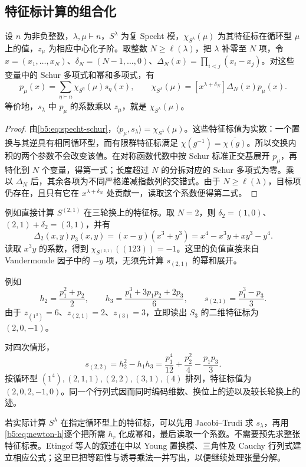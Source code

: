 \subsection{特征标计算的组合化}
\label{b5:subsec:0702:03}

\begin{corollary}\label{b5:cor:frobenius-coefficient}
	设 \(n\) 为非负整数，\(\lambda,\mu\vdash n\)，\(S^\lambda\) 为复 Specht 模，\(\chi_{S^\lambda}(\mu)\) 为其特征标在循环型 \(\mu\) 上的值，\(z_\mu\) 为相应中心化子阶。取整数 \(N\ge\ell(\lambda)\)，把 \(\lambda\) 补零至 \(N\) 项，令 \(x=(x_1,\ldots,x_N)\)、\(\delta_N=(N-1,\ldots,0)\)、\(\Delta_N(x)=\prod_{i<j}(x_i-x_j)\)。对这些变量中的 Schur 多项式和幂和多项式，有
	\[
		p_\mu(x)=\sum_{\eta\vdash n}\chi_{S^\eta}(\mu)s_\eta(x), \qquad \chi_{S^\lambda}(\mu) =[x^{\lambda+\delta_N}]\Delta_N(x)p_\mu(x).
	\]
	等价地，\(s_\lambda\) 中 \(p_\mu\) 的系数乘以 \(z_\mu\)，就是 \(\chi_{S^\lambda}(\mu)\)。
\end{corollary}
\begin{proof}
	由\eqref{b5:eq:specht-schur}，\(\langle p_\mu,s_\lambda\rangle=\chi_{S^\lambda}(\mu)\)。这些特征标值为实数：一个置换与其逆具有相同循环型，而有限群特征标满足 \(\chi(g^{-1})=\overline{\chi(g)}\)。所以交换内积的两个参数不会改变该值。在对称函数代数中按 Schur 标准正交基展开 \(p_\mu\)，再特化到 \(N\) 个变量，得第一式；长度超过 \(N\) 的分拆对应的 Schur 多项式为零。乘以 \(\Delta_N\) 后，其余各项为不同严格递减指数列的交错式。由于 \(N\ge\ell(\lambda)\)，目标项仍存在，且只有它在 \(x^{\lambda+\delta_N}\) 处贡献一，读取这个系数便得第二式。
\end{proof}

例如直接计算 \(S^{(2,1)}\) 在三轮换上的特征标。取 \(N=2\)，则 \(\delta_2=(1,0)\)、\((2,1)+\delta_2=(3,1)\)，并有
\[
	\Delta_2(x,y)p_3(x,y) =(x-y)(x^3+y^3)=x^4-x^3y+xy^3-y^4.
\]
读取 \(x^3y\) 的系数，得到 \(\chi_{S^{(2,1)}}((123))=-1\)。这里的负值直接来自 Vandermonde 因子中的 \(-y\) 项，无须先计算 \(s_{(2,1)}\) 的幂和展开。

\ProseParagraphBreak

例如
\[
	h_2=\frac{p_1^2+p_2}{2},\qquad h_3=\frac{p_1^3+3p_1p_2+2p_3}{6}, \qquad s_{(2,1)}=\frac{p_1^3-p_3}{3}.
\]
由于 \(z_{(1^3)}=6\)、\(z_{(2,1)}=2\)、\(z_{(3)}=3\)，立即读出 \(S_3\) 的二维特征标为 \((2,0,-1)\)。

\ProseParagraphBreak
对四次情形，
\[
	s_{(2,2)}=h_2^2-h_1h_3 =\frac{p_1^4}{12}+\frac{p_2^2}{4}-\frac{p_1p_3}{3}.
\]
按循环型 \((1^4),(2,1,1),(2,2),(3,1),(4)\) 排列，特征标值为 \((2,0,2,-1,0)\)。同一个行列式因而同时编码维数、换位上的迹以及较长轮换上的迹。

\ProseParagraphBreak
若实际计算 \(S^\lambda\) 在指定循环型上的特征标，可以先用 Jacobi--Trudi 求 \(s_\lambda\)，再用\eqref{b5:eq:newton-h}逐个把所需 \(h_r\) 化成幂和，最后读取一个系数。不需要预先求整张特征标表。Etingof 等人的叙述在\cite[Sections 5.14--5.15, pp. 114--118]{EtingofEtAl2011RepresentationTheory}中以 Young 置换模、三角性及 Cauchy 行列式建立相应公式；这里已把等距性与诱导乘法一并写出，以便继续处理张量分解。
